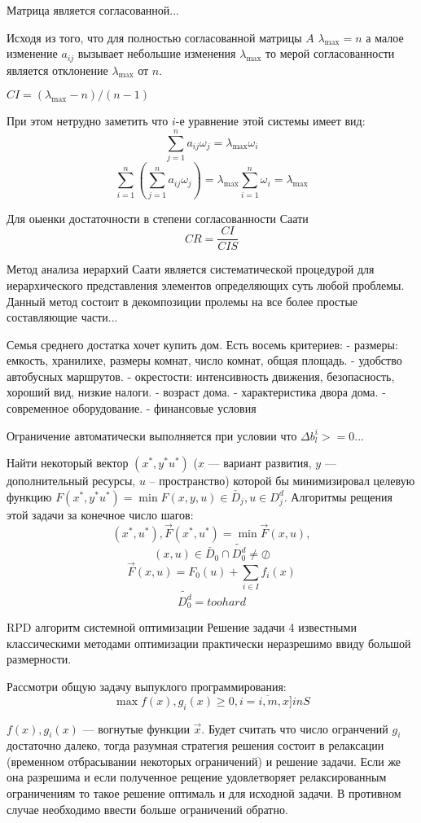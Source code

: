 Матрица является согласованной...

Исходя из того, что для полностью согласованной матрицы $A$ $\lambda_\max=n$ а малое изменение $a_{ij}$ вызывает небольшие изменения $\lambda_\max$ то мерой согласованности является отклонение $\lambda_\max$ от $n$.

$CI = (\lambda_\max - n) / (n - 1)$

При этом нетрудно заметить что $i$-е уравнение этой системы имеет вид:
\[
    \sum^n_{j=1}a_{ij}\omega_j=\lambda_\max \omega_i
\]
\[
    \sum_{i=1}^n (\sum^n_{j=1}a_{ij}\omega_j)= \lambda_\max \sum_{i=1}^n \omega_i = \lambda_\max
\]

Для оыенки достаточности в степени согласованности Саати 
\[
    CR = \frac{CI}{CIS}
\]

Метод анализа иерархий Саати является систематической процедурой для иерархического представления элементов определяющих суть любой проблемы.
Данный метод состоит в декомпозиции пролемы на все более простые составляющие части...

Семья среднего достатка хочет купить дом. Есть восемь критериев: 
- размеры: емкость, хранилихе, размеры комнат, число комнат, общая площадь.
- удобство автобусных маршрутов.
- окрестости: интенсивность движения, безопасность, хороший вид, низкие налоги.
- возраст дома.
- характеристика двора дома.
- современное оборудование.
- финансовые условия


Ограничение автоматически выполняется при условии что $\Delta b^i_l >= 0$...

Найти некоторый вектор $(x^*, y^* u^*)$ ($x$ --- вариант развития, $y$ --- дополнительный ресурсы, $u$ -- пространство) которой бы минимизировал целевую функцию $F(x^*, y^* u^*) = \min F(x, y, u) \in \check{D_j}, u \in D^d_j$. 
Алгоритмы рещения этой задачи за конечное число шагов:
\[ (x^*, u^*), \vec{F}(x^*, u^*) = \min \vec{F}(x,u), \]
\[ (x, u) \in \check{D_0} \cap \tilde{D_0^d} \neq \oslash \]
\[ \vec{F}(x, u) = F_0(u) + \sum_{i \in I}f_i(x) \]
\[ \tilde{D^d_0} = too hard \]


RPD алгоритм системной оптимизации
Решение задачи 4 известными классическими методами оптимизации практически неразрешимо ввиду большой размерности.

Рассмотри общую задачу выпуклого программирования:
\[ \max f(x), g_i(x) \geq 0, i = \overline{i, m}, x ] in S \]

$f(x), g_i(x)$ --- вогнутые функции $\vec{x}$.
Будет считать что число огранчений $g_i$ достаточно далеко, тогда разумная стратегия решения состоит в релаксации (временном отбрасывании некоторых ограничений) и решение задачи. Если же она разрешима и если полученное рещение удовлетворяет релаксированным ограничениям то такое решение оптималь и для исходной задачи. В противном случае необходимо ввести больше ограничений обратно.


